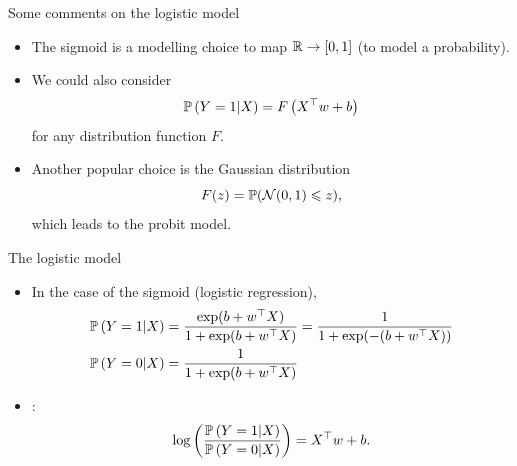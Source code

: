 \documentclass[xcolor={usenames,dvipsnames}]{beamer}
\begin{document}
\begin{frame}{Some comments on the logistic model}
\begin{itemize}
\item The sigmoid is a modelling choice to map $\R \to [0, 1]$ (to model a probability).
\item We could also consider
$$
\P\left(  Y = 1 | X\right) = F \left( X^\top w +b \right)
$$
for any \alert{distribution function $F$}. 
\item Another popular choice is the
Gaussian distribution
$$ F(z) = \P(\Nc(0,1) \leq  z),
$$
which leads to the \alert{probit model}.
\end{itemize}
\end{frame}

\begin{frame}{The logistic model}

\begin{itemize}
\item In the case of the sigmoid (\alert{logistic regression}),
\begin{align*}
\P\left(  Y = 1 | X \right) &= \frac{\exp (b+ w^\top X)}{1+ \exp(b+ w^\top X)} = \frac{1}{1+\exp(-(b+ w^\top X)) } \\
\P\left(  Y = 0 | X \right) &=  \frac{1}{1+\exp(b+ w^\top X) }
\end{align*}

\vspace{.3cm}

\item {}:
$$
\log \left( \frac{\P\left(  Y = 1 | X \right)}{\P\left(  Y = 0| X  \right)} \right) = X^\top w +b.
$$

\end{itemize}
\end{frame}
\end{document}
